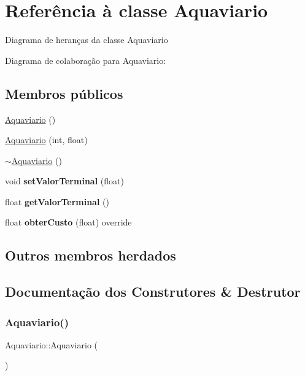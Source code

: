 \hypertarget{classAquaviario}{}\section{Referência à classe Aquaviario}
\label{classAquaviario}


Diagrama de heranças da classe Aquaviario


Diagrama de colaboração para Aquaviario\+:
\subsection*{Membros públicos}
\begin{DoxyCompactItemize}
\item 
\hyperlink{classAquaviario_a75a5b971394d2c3c74bc53293530d7c6}{Aquaviario} ()
\item 
\hyperlink{classAquaviario_a331abedc032bba3076427a3e555dc6fd}{Aquaviario} (int, float)
\item 
\hyperlink{classAquaviario_a71c1378131f32535dcad3e714e643c1d}{$\sim$\+Aquaviario} ()
\item 
\mbox{\label{classAquaviario_a9d2a7813c34be1532570788e15b1fd2a}} 
void {\bfseries set\+Valor\+Terminal} (float)
\item 
\mbox{\label{classAquaviario_a74219219dcaf439a23c53a4c5eb1f151}} 
float {\bfseries get\+Valor\+Terminal} ()
\item 
\mbox{\label{classAquaviario_a14803bda14b188a33a8f726d90171746}} 
float {\bfseries obter\+Custo} (float) override
\end{DoxyCompactItemize}
\subsection*{Outros membros herdados}


\subsection{Documentação dos Construtores \& Destrutor}
\mbox{\label{classAquaviario_a75a5b971394d2c3c74bc53293530d7c6}} 
\subsubsection{\texorpdfstring{Aquaviario()}{Aquaviario()}\hspace{0.1cm}{\footnotesize\ttfamily [1/2]}}
{\footnotesize\ttfamily Aquaviario\+::\+Aquaviario (\begin{DoxyParamCaption}{ }\end{DoxyParamCaption})}

